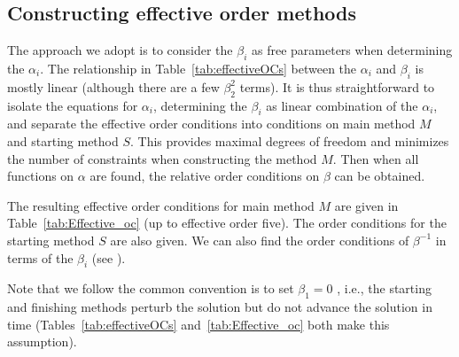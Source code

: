 \subsection{Constructing effective order methods}
The approach we adopt is to consider the $\beta_{i}$ as free
parameters when determining the $\alpha_i$.
The relationship in Table~\ref{tab:effectiveOCs} between the
$\alpha_i$ and $\beta_i$ is mostly linear (although there are a few
$\beta_2^2$ terms).
It is thus straightforward to isolate the equations for $\alpha_i$,
determining the $\beta_i$ as linear combination of the $\alpha_i$, and
separate the effective order conditions into conditions on main method
$M$ and starting method $S$.
This provides maximal degrees of freedom and minimizes the number of
constraints when constructing the method $M$.
Then when all functions on $\alpha$ are found, the relative order
conditions on $\beta$ can be obtained.

The resulting effective order conditions for main method $M$ are given
in Table~\ref{tab:Effective_oc} (up to effective order five).
The order conditions for the starting method $S$ are also given.
We can also find the order conditions of $\beta^{-1}$ in terms of the
$\beta_i$ (see \cite[Table~386(III)]{Butcher2008_book}).

Note that we follow the common convention is to set $\beta_1=0$
\cite{Butcher2008_book}, i.e., the starting and finishing methods
perturb the solution but do not advance the solution in time
(Tables~\ref{tab:effectiveOCs} and~\ref{tab:Effective_oc} both make
this assumption).


